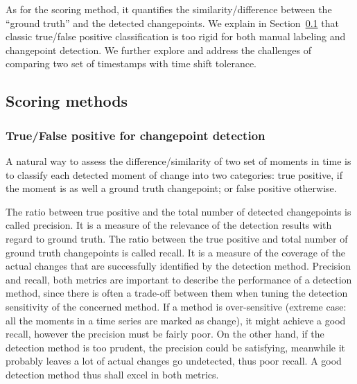 As for the scoring method, it quantifies the similarity/difference between the ``ground truth'' and the detected changepoints.
We explain in Section~\ref{sec:score} that classic true/false positive classification is too rigid for both manual labeling and changepoint detection.
We further explore and address the challenges of comparing two set of timestamps with time shift tolerance.

\subsection{Scoring methods}
\label{sec:score}

\subsubsection{True/False positive for changepoint detection}

A natural way to assess the difference/similarity of two set of moments in time is to classify each detected moment of change into two categories: true positive, if the moment is as well a ground truth changepoint; or false positive otherwise.

The ratio between true positive and the total number of detected changepoints is called precision.
It is a measure of the relevance of the detection results with regard to ground truth.
The ratio between the true positive and total number of ground truth changepoints is called recall.
It is a measure of the coverage of the actual changes that are successfully identified by the detection method.
Precision and recall, both metrics are important to describe the performance of a detection method, since there is often a trade-off between them when tuning the detection sensitivity of the concerned method.
If a method is over-sensitive (extreme case: all the moments in a time series are marked as change), it might achieve a good recall,  however the precision must be fairly poor.
On the other hand, if the detection method is too prudent, the precision could be satisfying, meanwhile it probably leaves a lot of actual changes go undetected, thus poor recall.
A good detection method thus shall excel in both metrics.

